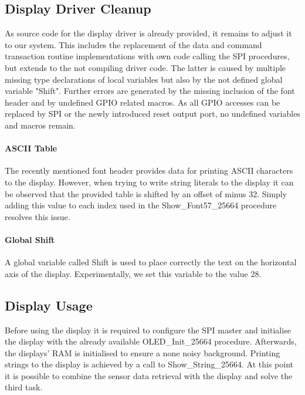 		\subsection{Display Driver Cleanup} %
		\label{sub:impl_display_driver_cleanup}
			As source code for the display driver is already provided, it remains to adjust it to our system. This includes the replacement of the data and command transaction routine implementations with own code calling the SPI procedures, but extends to the not compiling driver code. The latter is caused by multiple missing type declarations of local variables but also by the not defined global variable "Shift". Further errors are generated by the missing inclusion of the font header and by undefined GPIO related macros. As all GPIO accesses can be replaced by SPI or the newly introduced reset output port, no undefined variables and macros remain.

			\paragraph{ASCII Table} %
			\label{par:ascii_table}
				The recently mentioned font header provides data for printing ASCII characters to the display. However, when trying to write string literals to the display it can be observed that the provided table is shifted by an offset of minus 32. Simply adding this value to each index used in the Show\_Font57\_25664 procedure resolves this issue.

			\paragraph{Global Shift} %
			\label{par:global_shift}
				A global variable called \“Shift\” is used to place correctly the text on the horizontal axis of the display. Experimentally, we set this variable to the value 28. 

		\subsection{Display Usage} %
		\label{sub:display_usage}
			Before using the display it is required to configure the SPI master and initialise the display with the already available OLED\_Init\_25664 procedure. Afterwards, the displays' RAM is initialised to ensure a none noisy background.
			Printing strings to the display is achieved by a call to Show\_String\_25664. At this point it is possible to combine the sensor data retrieval with the display and solve the third task.

